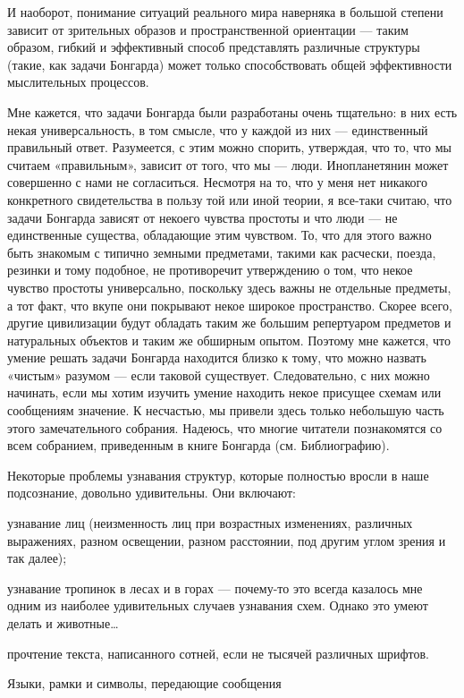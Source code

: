 \documentclass[../main.tex]{subfiles}
\begin{document}
И наоборот, понимание ситуаций реального мира наверняка в большой степени зависит от зрительных образов и пространственной ориентации --- таким образом, гибкий и эффективный способ представлять различные структуры (такие, как задачи Бонгарда) может только способствовать общей эффективности мыслительных процессов.

Мне кажется, что задачи Бонгарда были разработаны очень тщательно: в них есть некая универсальность, в том смысле, что у каждой из них --- единственный правильный ответ. Разумеется, с этим можно спорить, утверждая, что то, что мы считаем «правильным», зависит от того, что мы --- люди. Инопланетянин может совершенно с нами не согласиться. Несмотря на то, что у меня нет никакого конкретного свидетельства в пользу той или иной теории, я все-таки считаю, что задачи Бонгарда зависят от некоего чувства простоты и что люди --- не единственные существа, обладающие этим чувством. То, что для этого важно быть знакомым с типично земными предметами, такими как расчески, поезда, резинки и тому подобное, не противоречит утверждению о том, что некое чувство простоты универсально, поскольку здесь важны не отдельные предметы, а тот факт, что вкупе они покрывают некое широкое пространство. Скорее всего, другие цивилизации будут обладать таким же большим репертуаром предметов и натуральных объектов и таким же обширным опытом. Поэтому мне кажется, что умение решать задачи Бонгарда находится близко к тому, что можно назвать «чистым» разумом --- если таковой существует. Следовательно, с них можно начинать, если мы хотим изучить умение находить некое присущее схемам или сообщениям значение. К несчастью, мы привели здесь только небольшую часть этого замечательного собрания. Надеюсь, что многие читатели познакомятся со всем собранием, приведенным в книге Бонгарда (см. Библиографию).

Некоторые проблемы узнавания структур, которые полностью вросли в наше подсознание, довольно удивительны. Они включают:

узнавание лиц (неизменность лиц при возрастных изменениях, различных выражениях, разном освещении, разном расстоянии, под другим углом зрения и так далее);

узнавание тропинок в лесах и в горах --- почему-то это всегда казалось мне одним из наиболее удивительных случаев узнавания схем. Однако это умеют делать и животные\ldots{}

прочтение текста, написанного сотней, если не тысячей различных шрифтов.

Языки, рамки и символы, передающие сообщения
\end{document}
